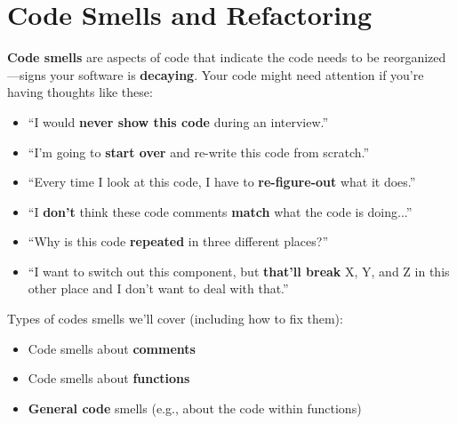\yesmargins

\chapter{Code Smells and Refactoring}


\textbf{Code smells} are aspects of code that indicate the code needs to be reorganized---signs your software is \textbf{decaying}\marginpar{\codeSmellDef\margindivider}\marginpar{\codeDecayDef}. Your code might need attention if you're having thoughts like these:

\begin{itemize}
\item ``I would \textbf{never show this code} during an interview.''
\item ``I'm going to \textbf{start over} and re-write this code from scratch.''
\item ``Every time I look at this code, I have to \textbf{re-figure-out} what it does.''
\item ``I \textbf{don't} think these code comments \textbf{match} what the code is doing...''
\item ``Why is this code \textbf{repeated} in three different places?''
\item ``I want to switch out this component, but \textbf{that'll break} X, Y, and Z in this other place and I don't want to deal with that.''
\end{itemize}

Types of codes smells we'll cover (including how to fix them):\\

\begin{itemize}
\item Code smells about \textbf{comments}
\item Code smells about \textbf{functions}
\item \textbf{General code} smells (e.g., about the code within functions)\\
\end{itemize}


